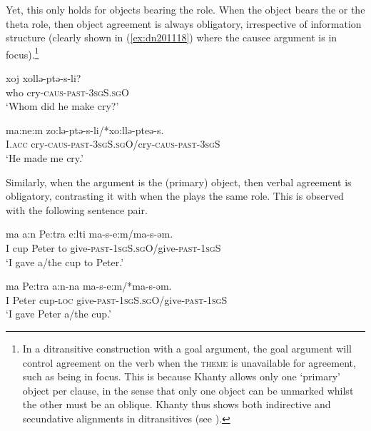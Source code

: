 \documentclass[output=paper
,modfonts
,nonflat]{langsci/langscibook}
\begin{document}
Yet, this only holds for objects bearing the \theme{} role.
When the object bears the \goal{} or the \causee{} theta role, then object agreement is always obligatory, irrespective of information structure (clearly shown in (\ref{ex:dn201118}) where the causee argument is in focus).\footnote{In a ditransitive construction with a goal argument, the goal argument will control agreement on the verb when the \textsc{theme} is unavailable for agreement, such as being in focus.
This is because Khanty allows only one `primary' object per clause, in the sense that only one object can be unmarked whilst the other must be an oblique.
Khanty thus shows both indirective and secundative alignments in ditransitives (see \citealt{haspelmath2005,Barany2015}).
} 

\begin{exe}
\ex \citet[][149]{dn2011}
\begin{xlist}
\ex
{\gll xoj xollə-ptə-s-li?\\
who cry-\textsc{caus-past-3sgS.sgO}\\
\glt `Whom did he make cry?'} \label{ex:dn201118}

\ex
{\gll ma:ne:m zo:lə-ptə-s-li/*xo:llə-pteə-s.\\
I.\textsc{acc} cry-\textsc{caus-past-3sgS.sgO}/cry-\textsc{caus-past-3sgS}\\
\glt `He made me cry.'} \label{ex:dn201119}

\end{xlist}
\end{exe}

\noindent Similarly, when the \goal{} argument is the (primary) object, then verbal agreement is obligatory, contrasting it with when the \theme{} plays the same role. 
This is observed with the following sentence pair. 

\begin{exe}
\ex \citet[][148]{dn2011}
\begin{xlist}
\ex
{\gll ma a:n Pe:tra e:lti ma-s-e:m/ma-s-əm.\\
I cup Peter to give-\textsc{past-1sgS.sgO}/give-\textsc{past-1sgS}\\
\glt `I gave a/the cup to Peter.'}

\ex
{\gll ma Pe:tra a:n-na ma-s-e:m/*ma-s-əm.\\
I Peter cup-\textsc{loc} give-\textsc{past-1sgS.sgO}/give-\textsc{past-1sgS}\\
\glt `I gave Peter a/the cup.'}
\end{xlist}
\end{exe}
\end{document}
